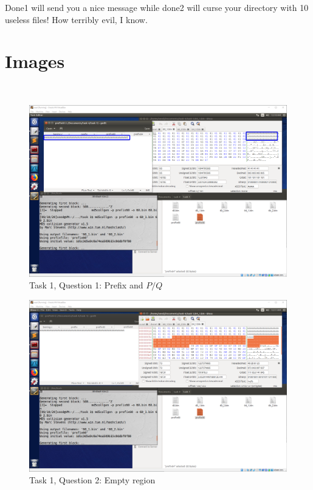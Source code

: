 \documentclass[a4paper]{article}
\begin{document}
Done1 will send you a nice message while done2 will curse your directory with 10 useless files! How terribly evil, I know.
\newpage
\section{Images}
\
\begin{figure}
  \includegraphics[width=\textwidth]{task1.png}
  \caption{Task 1, Question 1: Prefix and $P/Q$}
  \label{task1}
\end{figure}
\begin{figure}
  \includegraphics[width=\textwidth]{question2.png}
  \caption{Task 1, Question 2: Empty region}
  \label{question2}
\end{figure}
\end{document}
